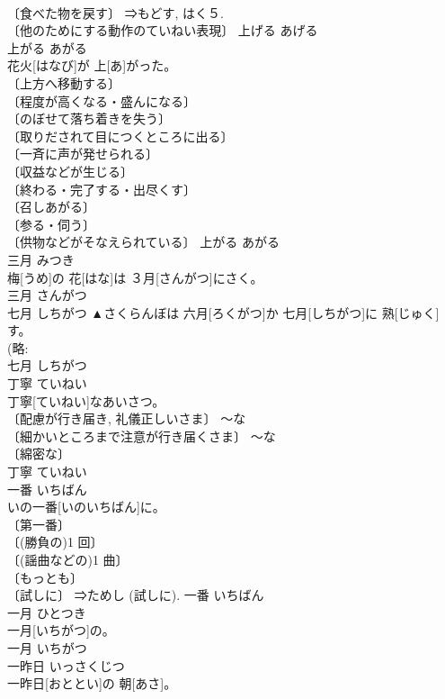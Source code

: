 \documentclass[8pt]{extreport}
\begin{document}
\begin{CJK}{UTF8}{min}
\\	〔食べた物を戻す〕 ⇒もどす, はく５. 
\\	〔他のためにする動作のていねい表現〕	上げる	あげる	
\\	上がる	あがる	
\\	花火[はなび]が 上[あ]がった。	
\\	〔上方へ移動する〕 
\\	〔程度が高くなる・盛んになる〕 
\\	〔のぼせて落ち着きを失う〕 
\\	〔取りだされて目につくところに出る〕 
\\	〔一斉に声が発せられる〕 
\\	〔収益などが生じる〕 
\\	〔終わる・完了する・出尽くす〕 
\\	〔召しあがる〕 
\\	〔参る・伺う〕 
\\	〔供物などがそなえられている〕	上がる	あがる	
\\	三月	みつき	
\\	梅[うめ]の 花[はな]は ３月[さんがつ]にさく。	
\\	三月	さんがつ	
\\	七月	しちがつ	▲さくらんぼは 六月[ろくがつ]か 七月[しちがつ]に 熟[じゅく]す。	
\\	(略: 
\\	七月	しちがつ	
\\	丁寧	ていねい	
\\	丁寧[ていねい]なあいさつ。	
\\	〔配慮が行き届き, 礼儀正しいさま〕 ～な 
\\	〔細かいところまで注意が行き届くさま〕 ～な 
\\	〔綿密な〕 
\\	丁寧	ていねい	
\\	一番	いちばん	
\\	いの一番[いのいちばん]に。	
\\	〔第一番〕 
\\	〔(勝負の)1 回〕 
\\	〔(謡曲などの)1 曲〕 
\\	〔もっとも〕 
\\	〔試しに〕 ⇒ためし (試しに).	一番	いちばん	
\\	一月	ひとつき	
\\	一月[いちがつ]の。	
\\	一月	いちがつ	
\\	一昨日	いっさくじつ	
\\	一昨日[おととい]の 朝[あさ]。	

\end{CJK}
\end{document}
